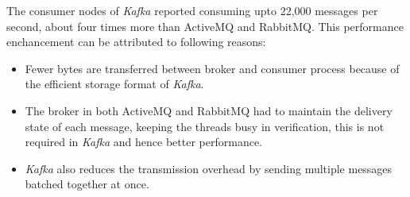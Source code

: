 \documentclass[12pt, a4paper]{article}
\begin{document}
The consumer nodes of \textit{Kafka} reported consuming upto 22,000 messages per second, about four times more than ActiveMQ and RabbitMQ. This performance enchancement can be attributed to following reasons:
\begin{itemize}
    \item Fewer bytes are transferred between broker and consumer process because of the efficient storage format of \textit{Kafka}.

    \item The broker in both ActiveMQ and RabbitMQ had to maintain the delivery state of each message, keeping the threads busy in verification, this is not required in \textit{Kafka} and hence better performance.

    \item \textit{Kafka} also reduces the transmission overhead by sending multiple messages batched together at once.
\end{itemize}
\end{document}

